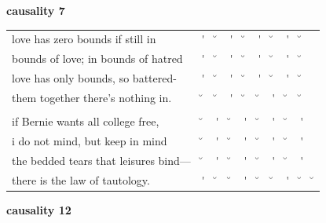 \documentclass[12pt, landscape]{article}
\begin{document}
\vspace*{\fill}

\noindent \textbf{causality 7}
\noindent \hfill \par

\begin{center}
\begin{tabularx}{\textwidth}{
>{\lefting\arraybackslash}X
c
c
c
c
c
c
c
c
c
}

love has zero bounds if still in & \'{} & \u{} & \'{} & \u{} & \'{} & \u{} & \'{} & \u{} & \\
bounds of love; in bounds of hatred & \'{} & \u{} & \'{} & \u{} & \'{} & \u{} & \'{} & \u{} & \\
love has only bounds, so battered- & \'{} & \u{} & \'{} & \u{} & \'{} & \u{} & \'{} & \u{} & \\
them together there's nothing in. & \u{} & \u{} & \'{} & \u{} & \u{} & \'{} & \u{} & \u{} & \\
 & & & & & & & & \\
if Bernie wants all college free, & \u{} & \'{} & \u{} & \'{} & \u{} & \'{} & \u{} & \'{} & \\
i do not mind, but keep in mind & \u{} & \'{} & \u{} & \'{} & \u{} & \'{} & \u{} & \'{} & \\
the bedded tears that leisures bind--- & \u{} & \'{} & \u{} & \'{} & \u{} & \'{} & \u{} & \'{} & \\
there is the law of tautology. & \'{} & \u{} & \u{} & \'{} & \u{} & \u{} & \'{} & \u{} & \u{} \\

\end{tabularx}
\end{center}

\vspace*{\fill}

\newpage

\vspace*{\fill}

\noindent \textbf{causality 12}
\noindent \hfill \par
\end{document}
